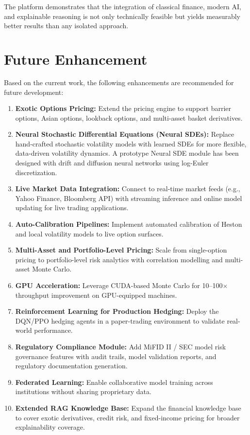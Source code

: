 \documentclass[12pt,a4paper]{report}
\begin{document}
The platform demonstrates that the integration of classical finance, modern AI, and explainable reasoning is not only technically feasible but yields measurably better results than any isolated approach.

\section{Future Enhancement}

Based on the current work, the following enhancements are recommended for future development:

\begin{enumerate}
    \item \textbf{Exotic Options Pricing:} Extend the pricing engine to support barrier options, Asian options, lookback options, and multi-asset basket derivatives.

    \item \textbf{Neural Stochastic Differential Equations (Neural SDEs):} Replace hand-crafted stochastic volatility models with learned SDEs for more flexible, data-driven volatility dynamics. A prototype Neural SDE module has been designed with drift and diffusion neural networks using log-Euler discretization.

    \item \textbf{Live Market Data Integration:} Connect to real-time market feeds (e.g., Yahoo Finance, Bloomberg API) with streaming inference and online model updating for live trading applications.

    \item \textbf{Auto-Calibration Pipelines:} Implement automated calibration of Heston and local volatility models to live option surfaces.

    \item \textbf{Multi-Asset and Portfolio-Level Pricing:} Scale from single-option pricing to portfolio-level risk analytics with correlation modelling and multi-asset Monte Carlo.

    \item \textbf{GPU Acceleration:} Leverage CUDA-based Monte Carlo for 10--100$\times$ throughput improvement on GPU-equipped machines.

    \item \textbf{Reinforcement Learning for Production Hedging:} Deploy the DQN/PPO hedging agents in a paper-trading environment to validate real-world performance.

    \item \textbf{Regulatory Compliance Module:} Add MiFID II / SEC model risk governance features with audit trails, model validation reports, and regulatory documentation generation.

    \item \textbf{Federated Learning:} Enable collaborative model training across institutions without sharing proprietary data.

    \item \textbf{Extended RAG Knowledge Base:} Expand the financial knowledge base to cover exotic derivatives, credit risk, and fixed-income pricing for broader explainability coverage.
\end{enumerate}
\end{document}
